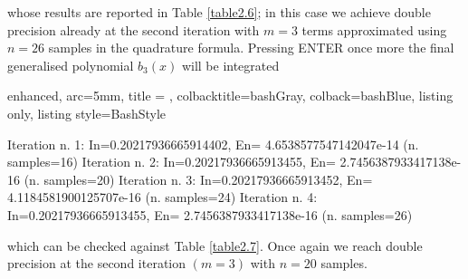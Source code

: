 \documentclass[a4paper, twosided]{book}
\begin{document}
\noindent
whose results are reported in Table \ref{table2.6}; in this case we achieve double precision already at the second iteration with $m=3$ terms approximated using $n=26$ samples in the quadrature formula. Pressing \colorbox{poliGrayBlue}{ENTER} once more the final generalised polynomial $b_3(x)$ will be integrated

\vspace{0.2cm}
\begin{tcblisting}{enhanced,
                   arc=5mm,
                   title = \color{black}{\large \ttfamily Executing the bessels test case: b\_3(x)},
                   colbacktitle=bashGray,
                   colback=bashBlue,
                   listing only,
                   listing style=BashStyle}

Iteration n. 1:  In=0.20217936665914402, En= 4.6538577547142047e-14   (n. samples=16)
Iteration n. 2:  In=0.20217936665913455, En= 2.7456387933417138e-16   (n. samples=20)
Iteration n. 3:  In=0.20217936665913452, En= 4.1184581900125707e-16   (n. samples=24)
Iteration n. 4:  In=0.20217936665913455, En= 2.7456387933417138e-16   (n. samples=26)

\end{tcblisting}
\vspace{0.3cm}

\noindent
which can be checked against Table \ref{table2.7}. Once again we reach double precision at the second iteration $(m=3)$ with $n=20$ samples. 
\end{document}
